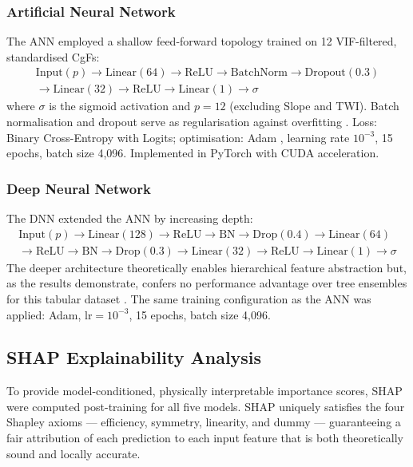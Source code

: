 \documentclass[12pt, a4paper]{article}
\begin{document}
\subsubsection{Artificial Neural Network}
The ANN employed a shallow feed-forward topology trained on 12 VIF-filtered, standardised CgFs:
\begin{multline}
    \text{Input}(p) \to \text{Linear}(64) \to \text{ReLU} \to \text{BatchNorm} \to \text{Dropout}(0.3) \\
    \to \text{Linear}(32) \to \text{ReLU} \to \text{Linear}(1) \to \sigma
\end{multline}
where $\sigma$ is the sigmoid activation and $p = 12$ (excluding Slope and TWI). Batch normalisation and dropout serve as regularisation against overfitting \citep{ioffe2015, srivastava2014}. Loss: Binary Cross-Entropy with Logits; optimisation: Adam \citep{kingma2014}, learning rate $10^{-3}$, 15 epochs, batch size 4,096. Implemented in PyTorch \citep{paszke2019} with CUDA acceleration.

\subsubsection{Deep Neural Network}
The DNN extended the ANN by increasing depth:
\begin{multline}
    \text{Input}(p) \to \text{Linear}(128) \to \text{ReLU} \to \text{BN} \to \text{Drop}(0.4) \to \text{Linear}(64) \\
    \to \text{ReLU} \to \text{BN} \to \text{Drop}(0.3) \to \text{Linear}(32) \to \text{ReLU} \to \text{Linear}(1) \to \sigma
\end{multline}
The deeper architecture theoretically enables hierarchical feature abstraction but, as the results demonstrate, confers no performance advantage over tree ensembles for this tabular dataset \citep{grinsztajn2022, shwartzziv2022}. The same training configuration as the ANN was applied: Adam, $\text{lr} = 10^{-3}$, 15 epochs, batch size 4,096.

\subsection{SHAP Explainability Analysis}
\label{sec:shap_method}

To provide model-conditioned, physically interpretable importance scores, SHAP \citep{lundberg2017, lundberg2020} were computed post-training for all five models. SHAP uniquely satisfies the four Shapley axioms --- efficiency, symmetry, linearity, and dummy \citep{shapley1953} --- guaranteeing a fair attribution of each prediction to each input feature that is both theoretically sound and locally accurate.
\end{document}
